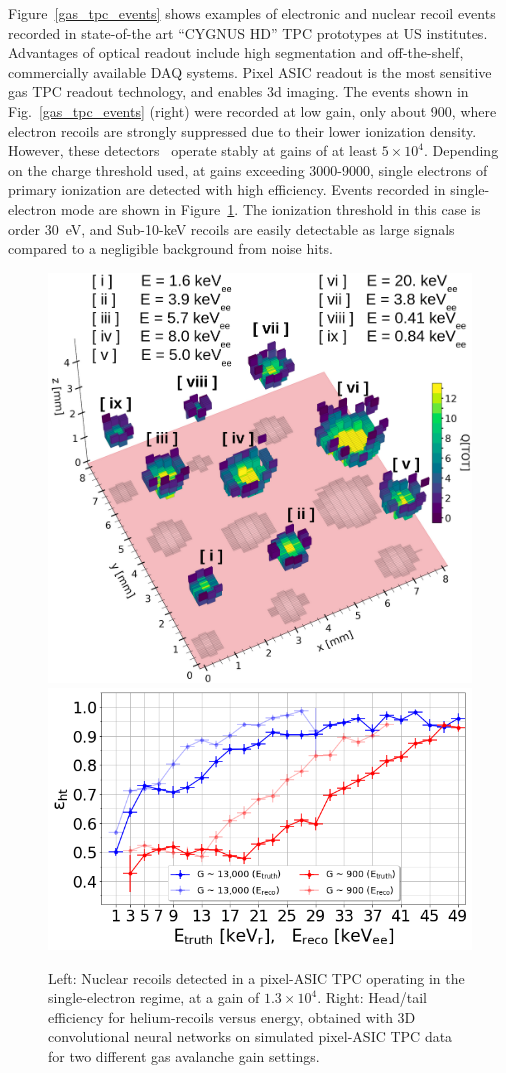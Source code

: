 Figure~\ref{gas_tpc_events} shows examples of electronic and nuclear recoil events recorded in state-of-the art ``CYGNUS HD'' TPC prototypes at US institutes. Advantages of optical readout include high segmentation and off-the-shelf, commercially available DAQ systems. Pixel ASIC readout is the most sensitive gas TPC readout technology, and enables 3d imaging. The events shown in Fig.~\ref{gas_tpc_events} (right) were recorded at low gain, only about 900, where electron recoils are strongly suppressed due to their lower ionization density. However, these detectors~\cite{Jaegle:2019jpx} operate stably at gains of at least $5\times 10^4$. Depending on the charge threshold used, at gains exceeding 3000-9000, single electrons of primary ionization are detected with high efficiency. Events recorded in single-electron mode are shown in Figure~\ref{single-electron}. The ionization threshold in this case is order 30~eV, and Sub-10-keV recoils are easily detectable as large signals compared to a negligible background from noise hits.


\begin{figure}[!htbp]
\begin{center}
\includegraphics[width=0.49\columnwidth]{figures/BEAST_higain.png}
\includegraphics[width=0.49\columnwidth]{figures/headtail.png}
\caption{Left: Nuclear recoils detected in a pixel-ASIC TPC operating in the single-electron regime, at a gain of $1.3\times 10^4$. Right: Head/tail efficiency for helium-recoils versus energy, obtained with 3D convolutional neural networks on simulated pixel-ASIC TPC data for two different gas avalanche gain settings. }\label{single-electron}
\end{center}
\end{figure}

